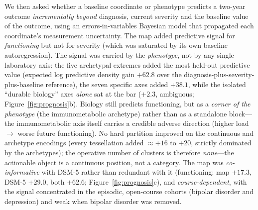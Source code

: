 We then asked whether a baseline coordinate or phenotype predicts a two-year outcome
\emph{incrementally beyond} diagnosis, current severity and the baseline value of the
outcome, using an errors-in-variables Bayesian model that propagated each coordinate's
measurement uncertainty. The map added predictive signal for \emph{functioning} but
not for severity (which was saturated by its own baseline autoregression). The signal
was carried by the \emph{phenotype}, not by any single laboratory axis: the five
archetypal extremes added the most held-out predictive value (expected log predictive
density gain $+62.8$ over the diagnosis-plus-severity-plus-baseline reference), the seven
specific axes added $+38.1$, while the isolated ``durable biology'' axes \emph{alone}
sat at the bar ($+2.3$, ambiguous; Figure~\ref{fig:prognosis}b). Biology still predicts
functioning, but as a \emph{corner of the phenotype} (the immunometabolic archetype)
rather than as a standalone block---the immunometabolic axis itself carries a credible
adverse direction (higher load $\to$ worse future functioning). No hard partition
improved on the continuous and archetype encodings (every tessellation added
$\approx+16$ to $+20$, strictly dominated by the archetypes); the operative number of
clusters is therefore \emph{none}---the actionable object is a continuous position, not a
category. The map was \emph{co-informative} with DSM-5 rather than redundant with it
(functioning: map $+17.3$, DSM-5 $+29.0$, both $+62.6$; Figure~\ref{fig:prognosis}c), and
\emph{course-dependent}, with the signal concentrated in the episodic, open-course
cohorts (bipolar disorder and depression) and weak when bipolar disorder was removed.

